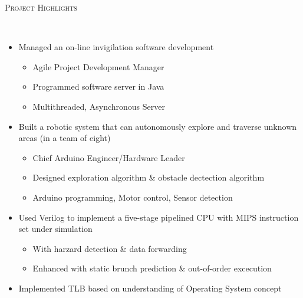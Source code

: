 \documentclass[a4paper, 12pt]{article}
\newenvironment{changemargin}[2]{%
  \begin{list}{}{%
      \setlength{\topsep}{0pt}%
      \setlength{\leftmargin}{#1}%
      \setlength{\rightmargin}{#2}%
      \setlength{\listparindent}{\parindent}%
      \setlength{\itemindent}{\parindent}%
      \setlength{\parsep}{\parskip}%
    }%
  \item[]}{\end{list}
}
\newcommand{\lineover}{
  \begin{changemargin}{-0.05in}{-0.05in}
    \vspace*{-8pt}
    \hrulefill \\
    \vspace*{-2pt}
  \end{changemargin}
}
\newcommand{\header}[1]{
  \begin{changemargin}{-0.5in}{-0.5in}
    \scshape{#1}\\
    \lineover
  \end{changemargin}
}
\newenvironment{body}
{
\vspace*{-16pt}
\begin{changemargin}{-0.25in}{-0.5in}
}	
{
\end{changemargin}
}
\begin{document}
%
%
%
%
\smallskip
\medskip
\header{Project Highlights}
\begin{body}
  \vspace{14pt}
  \begin{itemize} \itemsep 1pt
  \item Managed an on-line invigilation software development
    \begin{itemize} \itemsep -0pt \small
        \item Agile Project Development Manager
        \item Programmed software server in Java
        \item Multithreaded, Asynchronous Server
    \end{itemize}
  \item Built a robotic system that can autonomously explore and traverse unknown areas (in a team of eight)
    \begin{itemize} \itemsep -0pt \small
        \item Chief Arduino Engineer/Hardware Leader
        \item Designed exploration algorithm \& obstacle dectection algorithm
        \item Arduino programming, Motor control, Sensor detection
    \end{itemize}
  \item Used Verilog to implement a five-stage pipelined CPU with MIPS instruction set under simulation
    \begin{itemize} \itemsep -0pt \small
        \item With harzard detection \& data forwarding
        \item Enhanced with static brunch prediction \& out-of-order excecution
    \end{itemize}
  \item Implemented TLB based on understanding of Operating System concept

\end{itemize}
\end{body}
\end{document}
